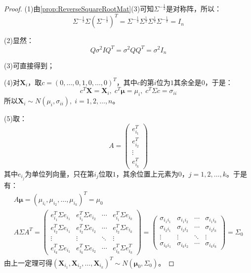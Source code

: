 \begin{proof}
	(1)由\cref{prop:ReverseSquareRootMat}(3)可知$\Sigma^{-\frac{1}{2}}$是对称阵，所以：
	\begin{equation*}
		\Sigma^{-\frac{1}{2}}\Sigma(\Sigma^{-\frac{1}{2}})^T=\Sigma^{-\frac{1}{2}}\Sigma^{\frac{1}{2}}\Sigma^{\frac{1}{2}}\Sigma^{-\frac{1}{2}}=I_n
	\end{equation*}\par
	(2)显然：
	\begin{equation*}
		Q\sigma^2IQ^T=\sigma^2QQ^T=\sigma^2I_n
	\end{equation*}\par
	(3)可直接得到；\par
	(4)对$\mathbf{X}_i$，取$c=(0,\dots,0,1,0,\dots,0)^T$，其中$c$的第$i$位为$1$其余全是$0$，于是：
	\begin{equation*}
		c^T\mathbf{X}=\mathbf{X}_i,\;c^T\boldsymbol{\mu}=\mu_i,\;c^T\Sigma c=\sigma_{ii}
	\end{equation*}
	所以$\mathbf{X}_i\sim N(\mu_i,\sigma_{ii}),\;i=1,2,\dots,n$。\par
	(5)取：
	\begin{equation*}
		A=
		\begin{pmatrix}
			e_{i_1}^T \\
			e_{i_2}^T \\
			\vdots \\
			e_{i_k}^T
		\end{pmatrix}
	\end{equation*}
	其中$e_{i_j}$为单位列向量，只在第$i_j$位取$1$，其余位置上元素为$0$，$j=1,2,\dots,k$。于是有：
	\begin{gather*}
		A\boldsymbol{\mu}=(\mu_{i_i},\mu_{i_2},\dots,\mu_{i_k})^T=\mu_0
		\\
		A\Sigma A^T=
		\begin{pmatrix}
			e_{i_1}^T\Sigma e_{i_1} & e_{i_1}^T\Sigma e_{i_2} & \cdots & e_{i_1}^T\Sigma e_{i_k} \\
			e_{i_2}^T\Sigma e_{i_1} & e_{i_2}^T\Sigma e_{i_2} & \cdots & e_{i_2}^T\Sigma e_{i_k} \\
			\vdots & \vdots & \ddots & \vdots \\
			e_{i_k}^T\Sigma e_{i_1} & e_{i_k}^T\Sigma e_{i_2} & \cdots & e_{i_k}^T\Sigma e_{i_k}^T
		\end{pmatrix}
		=
		\begin{pmatrix}
			\sigma_{i_1i_1} & \sigma_{i_1i_2} & \cdots & \sigma_{i_1i_k} \\
			\sigma_{i_2i_1} & \sigma_{i_2i_2} & \cdots & \sigma_{i_2i_k} \\
			\vdots & \vdots & \ddots & \vdots \\
			\sigma_{i_ki_1} & \sigma_{i_ki_2} & \cdots & \sigma_{i_ki_k}
		\end{pmatrix}
		=\Sigma_0
	\end{gather*}
	由上一定理可得$(\mathbf{X}_{i_1},\mathbf{X}_{i_2},\dots,\mathbf{X}_{i_k})^T\sim N(\boldsymbol{\mu}_0,\Sigma_0)$。
\end{proof}
